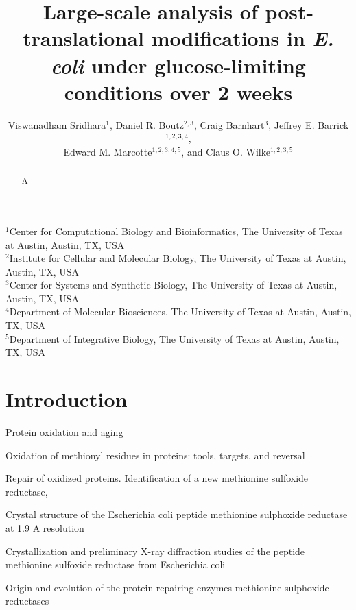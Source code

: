 \documentclass[12pt]{article}
\begin{document}
\title{Large-scale analysis of post-translational modifications in \emph{E. coli} under glucose-limiting conditions over 2 weeks}

\author{Viswanadham Sridhara$^1$, Daniel R. Boutz$^{2,3}$, Craig Barnhart$^3$, Jeffrey E. Barrick$^{1,2,3,4}$,\\
Edward M. Marcotte$^{1,2,3,4,5}$, and Claus O. Wilke$^{1,2,3,5}$}
\maketitle

\noindent
$^1$Center for Computational Biology and Bioinformatics, The University of Texas at Austin, Austin, TX, USA\\
$^2$Institute for Cellular and Molecular Biology, The University of Texas at Austin, Austin, TX, USA\\
$^3$Center for Systems and Synthetic Biology, The University of Texas at Austin, Austin, TX, USA\\
$^4$Department of Molecular Biosciences, The University of Texas at Austin, Austin, TX, USA\\
$^5$Department of Integrative Biology, The University of Texas at Austin, Austin, TX, USA\\


\begin{abstract}
A 
\end{abstract}


\section{Introduction}

\cite{Stadtman1992}
{Protein oxidation and aging}

\cite{Vogt1995}
{Oxidation of methionyl residues in proteins: tools, targets, and reversal}

\cite{Grimaudetal2001}
{Repair of oxidized proteins. Identification of a new methionine sulfoxide reductase},

\cite{Tete-Favieretal2000}
{Crystal structure of the Escherichia coli peptide methionine sulphoxide reductase at 1.9 A resolution}
   
\cite{Tete-Favieretal2000b}
{Crystallization and preliminary X-ray diffraction studies of the peptide methionine sulfoxide reductase from Escherichia coli}
   
\cite{ZhangWeissbach2008}
{Origin and evolution of the protein-repairing enzymes methionine sulphoxide reductases}
   
\end{document}
